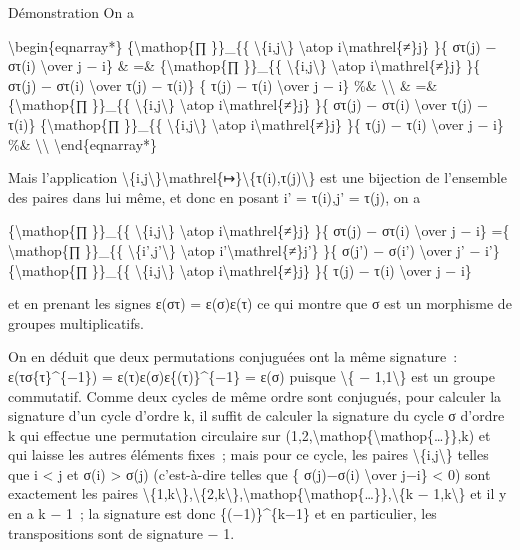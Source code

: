 \documentclass[]{article}
\begin{document}
Démonstration On a

\textbackslash{}begin\{eqnarray*\} \{\textbackslash{}mathop\{∏
\}\}\_\{\{ \textbackslash{}\{i,j\textbackslash{}\} \textbackslash{}atop
i\textbackslash{}mathrel\{≠\}j\} \}\{ στ(j) − στ(i) \textbackslash{}over
j − i\} \& =\& \{\textbackslash{}mathop\{∏ \}\}\_\{\{
\textbackslash{}\{i,j\textbackslash{}\} \textbackslash{}atop
i\textbackslash{}mathrel\{≠\}j\} \}\{ στ(j) − στ(i) \textbackslash{}over
τ(j) − τ(i)\} \{ τ(j) − τ(i) \textbackslash{}over j − i\} \%\&
\textbackslash{}\textbackslash{} \& =\& \{\textbackslash{}mathop\{∏
\}\}\_\{\{ \textbackslash{}\{i,j\textbackslash{}\} \textbackslash{}atop
i\textbackslash{}mathrel\{≠\}j\} \}\{ στ(j) − στ(i) \textbackslash{}over
τ(j) − τ(i)\} \{\textbackslash{}mathop\{∏ \}\}\_\{\{
\textbackslash{}\{i,j\textbackslash{}\} \textbackslash{}atop
i\textbackslash{}mathrel\{≠\}j\} \}\{ τ(j) − τ(i) \textbackslash{}over j
− i\} \%\& \textbackslash{}\textbackslash{}
\textbackslash{}end\{eqnarray*\}

Mais l'application
\textbackslash{}\{i,j\textbackslash{}\}\textbackslash{}mathrel\{↦\}\textbackslash{}\{τ(i),τ(j)\textbackslash{}\}
est une bijection de l'ensemble des paires dans lui même, et donc en
posant i' = τ(i),j' = τ(j), on a

\{\textbackslash{}mathop\{∏ \}\}\_\{\{
\textbackslash{}\{i,j\textbackslash{}\} \textbackslash{}atop
i\textbackslash{}mathrel\{≠\}j\} \}\{ στ(j) − στ(i) \textbackslash{}over
j − i\} =\{ \textbackslash{}mathop\{∏ \}\}\_\{\{
\textbackslash{}\{i',j'\textbackslash{}\} \textbackslash{}atop
i'\textbackslash{}mathrel\{≠\}j'\} \}\{ σ(j') − σ(i')
\textbackslash{}over j' − i'\} \{\textbackslash{}mathop\{∏ \}\}\_\{\{
\textbackslash{}\{i,j\textbackslash{}\} \textbackslash{}atop
i\textbackslash{}mathrel\{≠\}j\} \}\{ τ(j) − τ(i) \textbackslash{}over j
− i\}

et en prenant les signes ε(στ) = ε(σ)ε(τ) ce qui montre que σ est un
morphisme de groupes multiplicatifs.

On en déduit que deux permutations conjuguées ont la même signature~:
ε(τσ\{τ\}\^{}\{−1\}) = ε(τ)ε(σ)ε\{(τ)\}\^{}\{−1\} = ε(σ) puisque
\textbackslash{}\{ − 1,1\textbackslash{}\} est un groupe commutatif.
Comme deux cycles de même ordre sont conjugués, pour calculer la
signature d'un cycle d'ordre k, il suffit de calculer la signature du
cycle σ d'ordre k qui effectue une permutation circulaire sur
(1,2,\textbackslash{}mathop\{\textbackslash{}mathop\{\ldots{}\}\},k) et
qui laisse les autres éléments fixes~; mais pour ce cycle, les paires
\textbackslash{}\{i,j\textbackslash{}\} telles que i \textless{} j et
σ(i) \textgreater{} σ(j) (c'est-à-dire telles que \{ σ(j)−σ(i)
\textbackslash{}over j−i\} \textless{} 0) sont exactement les paires
\textbackslash{}\{1,k\textbackslash{}\},\textbackslash{}\{2,k\textbackslash{}\},\textbackslash{}mathop\{\textbackslash{}mathop\{\ldots{}\}\},\textbackslash{}\{k
− 1,k\textbackslash{}\} et il y en a k − 1~; la signature est donc
\{(−1)\}\^{}\{k−1\} et en particulier, les transpositions sont de
signature − 1.
\end{document}
